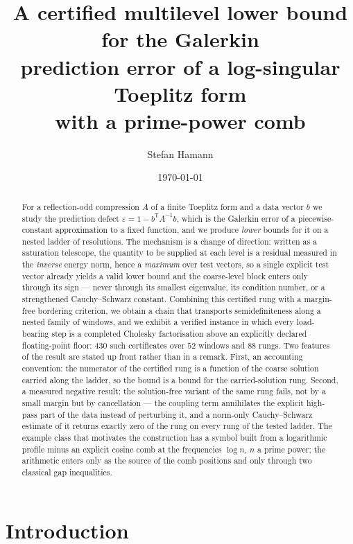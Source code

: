 \documentclass[11pt,a4paper]{article}
\title{A certified multilevel lower bound for the Galerkin\\
prediction error of a log-singular Toeplitz form\\
with a prime-power comb}
\author{Stefan Hamann}
\date{\today}
\theoremstyle{plain}
\theoremstyle{definition}
\newcommand{\T}{\mathsf{T}}
\begin{document}
\maketitle

\begin{abstract}
\noindent
For a reflection-odd compression $A$ of a finite Toeplitz form and a data vector $b$
we study the prediction defect $\varepsilon=1-b^{\T}A^{-1}b$, which is the Galerkin
error of a piecewise-constant approximation to a fixed function, and we produce
\emph{lower} bounds for it on a nested ladder of resolutions. The mechanism is a
change of direction: written as a saturation telescope, the quantity to be supplied
at each level is a residual measured in the \emph{inverse} energy norm, hence a
\emph{maximum} over test vectors, so a single explicit test vector already yields a
valid lower bound and the coarse-level block enters only through its sign --- never
through its smallest eigenvalue, its condition number, or a strengthened
Cauchy--Schwarz constant. Combining this certified rung with a margin-free bordering
criterion, we obtain a chain that transports semidefiniteness along a nested family
of windows, and we exhibit a verified instance in which every load-bearing step is a
completed Cholesky factorisation above an explicitly declared floating-point floor:
$430$ such certificates over $52$ windows and $88$ rungs. Two features of the result
are stated up front rather than in a remark. First, an accounting convention: the
numerator of the certified rung is a function of the coarse solution carried along
the ladder, so the bound is a bound for the carried-solution rung. Second, a measured
negative result: the solution-free variant of the same rung fails, not by a small
margin but by cancellation --- the coupling term annihilates the explicit high-pass
part of the data instead of perturbing it, and a norm-only Cauchy--Schwarz estimate of
it returns exactly zero of the rung on every rung of the tested ladder. The example
class that motivates the construction has a symbol built from a logarithmic profile
minus an explicit cosine comb at the frequencies $\log n$, $n$ a prime power; the
arithmetic enters only as the source of the comb positions and only through two
classical gap inequalities.
\end{abstract}

\section{Introduction}
\label{sec:intro}
\end{document}
